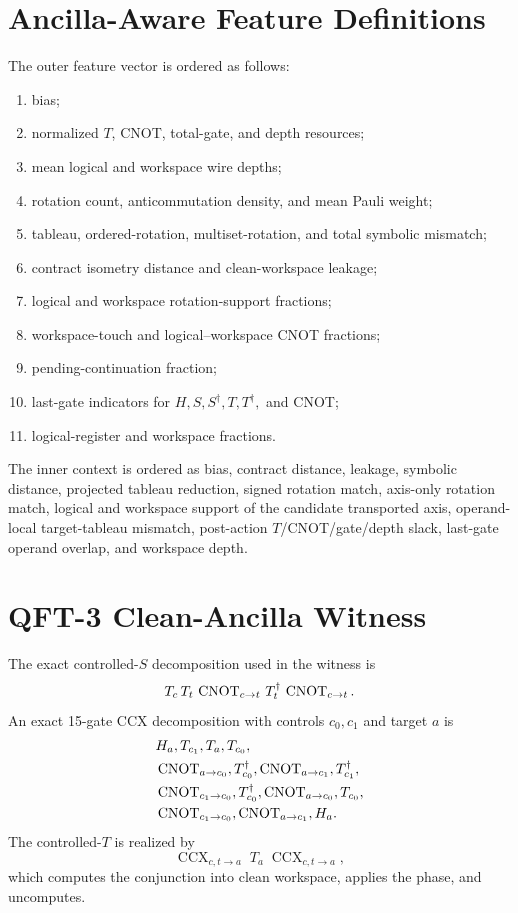 \appendices

\section{Ancilla-Aware Feature Definitions}

The outer feature vector is ordered as follows:
\begin{enumerate}
\item bias;
\item normalized $T$, CNOT, total-gate, and depth resources;
\item mean logical and workspace wire depths;
\item rotation count, anticommutation density, and mean Pauli weight;
\item tableau, ordered-rotation, multiset-rotation, and total symbolic mismatch;
\item contract isometry distance and clean-workspace leakage;
\item logical and workspace rotation-support fractions;
\item workspace-touch and logical--workspace CNOT fractions;
\item pending-continuation fraction;
\item last-gate indicators for $H,S,S^\dagger,T,T^\dagger,$ and CNOT;
\item logical-register and workspace fractions.
\end{enumerate}

The inner context is ordered as bias, contract distance, leakage, symbolic distance, projected tableau reduction, signed rotation match, axis-only rotation match, logical and workspace support of the candidate transported axis, operand-local target-tableau mismatch, post-action $T$/CNOT/gate/depth slack, last-gate operand overlap, and workspace depth.

\section{QFT-3 Clean-Ancilla Witness}

The exact controlled-$S$ decomposition used in the witness is
\begin{equation}
T_c\,T_t\,\operatorname{CNOT}_{c\to t}\,T_t^\dagger\,\operatorname{CNOT}_{c\to t}.
\end{equation}
An exact 15-gate CCX decomposition with controls $c_0,c_1$ and target $a$ is
\begin{align}
&H_a,T_{c_1},T_a,T_{c_0},\nonumber\\
&\operatorname{CNOT}_{a\to c_0},T_{c_0}^\dagger,
\operatorname{CNOT}_{a\to c_1},T_{c_1}^\dagger,\nonumber\\
&\operatorname{CNOT}_{c_1\to c_0},T_{c_0}^\dagger,
\operatorname{CNOT}_{a\to c_0},T_{c_0},\nonumber\\
&\operatorname{CNOT}_{c_1\to c_0},
\operatorname{CNOT}_{a\to c_1},H_a.
\end{align}
The controlled-$T$ is realized by
\begin{equation}
\operatorname{CCX}_{c,t\to a}
\;T_a\;
\operatorname{CCX}_{c,t\to a},
\end{equation}
which computes the conjunction into clean workspace, applies the phase, and uncomputes.

